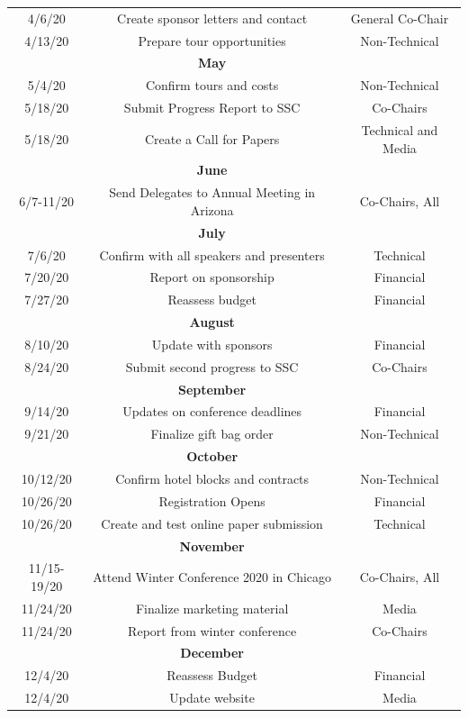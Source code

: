 \begin{center}
\begin{longtable}{c |  c  c}
\hline\hline
4/6/20 & Create sponsor letters and contact & General Co-Chair\\
4/13/20 & Prepare tour opportunities& Non-Technical\\
\hline\hline
&\textbf{May}&\\
\hline\hline
5/4/20 & Confirm tours and costs& Non-Technical\\
5/18/20 & Submit Progress Report to SSC& Co-Chairs\\
5/18/20 & Create a Call for Papers & Technical and Media\\
\hline\hline
&\textbf{June}&\\
\hline\hline
6/7-11/20 & Send Delegates to Annual Meeting in Arizona& Co-Chairs, All\\
\hline\hline
&\textbf{July}&\\
\hline\hline
7/6/20 & Confirm with all speakers and presenters& Technical\\
7/20/20 & Report on sponsorship& Financial\\
7/27/20 & Reassess budget& Financial\\
\hline\hline
&\textbf{August}&\\
\hline\hline
8/10/20 & Update with sponsors& Financial\\
8/24/20 & Submit second progress to SSC& Co-Chairs\\
\hline\hline
&\textbf{September}&\\
\hline\hline
9/14/20 & Updates on conference deadlines& Financial\\
9/21/20 & Finalize gift bag order& Non-Technical\\
\hline\hline
&\textbf{October}&\\
\hline\hline
10/12/20 & Confirm hotel blocks and contracts& Non-Technical\\
10/26/20 & Registration Opens& Financial\\
10/26/20 & Create and test online paper submission& Technical\\
\hline\hline
&\textbf{November}&\\
\hline\hline
11/15-19/20 & Attend Winter Conference 2020 in Chicago& Co-Chairs, All\\
11/24/20 & Finalize marketing material& Media\\
11/24/20 & Report from winter conference & Co-Chairs\\
\hline\hline
&\textbf{December}&\\
\hline\hline
12/4/20 & Reassess Budget & Financial \\
12/4/20 & Update website & Media \\

\end{longtable}
\end{center}
